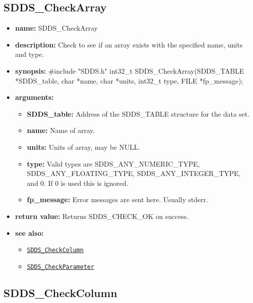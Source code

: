 \documentclass[11pt]{article}
\newcommand{\progref}[1]{\hyperref[SDDS_#1]{\tt SDDS\_#1}}
\begin{document}
\subsection{SDDS\_CheckArray}
\label{SDDS_CheckArray}

\begin{itemize}
\item {\bf name:}\newline
SDDS\_CheckArray
\item {\bf description:}\newline
Check to see if an array exists with the specified name, units and type.
\item {\bf synopsis:} \#include "SDDS.h"\newline
int32\_t SDDS\_CheckArray(SDDS\_TABLE *SDDS\_table, char *name, char *units, int32\_t type, FILE *fp\_message);
\item {\bf arguments:}
\begin{itemize}
\item {\bf SDDS\_table:} Address of the SDDS\_TABLE structure for the data set.
\item {\bf name:} Name of array.
\item {\bf units:} Units of array, may be NULL.
\item {\bf type:} Valid types are SDDS\_ANY\_NUMERIC\_TYPE, SDDS\_ANY\_FLOATING\_TYPE, SDDS\_ANY\_INTEGER\_TYPE, and 0. If 0 is used this is ignored.
\item {\bf fp\_message:} Error messages are sent here. Usually stderr.
\end{itemize}
\item {\bf return value:}\newline
Returns SDDS\_CHECK\_OK on success.
\item {\bf see also:}
\begin{itemize}
\item \progref{CheckColumn}
\item \progref{CheckParameter}
\end{itemize}
\end{itemize}

\subsection{SDDS\_CheckColumn}
\label{SDDS_CheckColumn}
\end{document}
